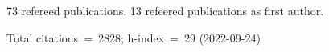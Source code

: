 73 refereed publications. 13 refeered publications as first author.

Total citations~=~2828; h-index~=~29 (2022-09-24)
